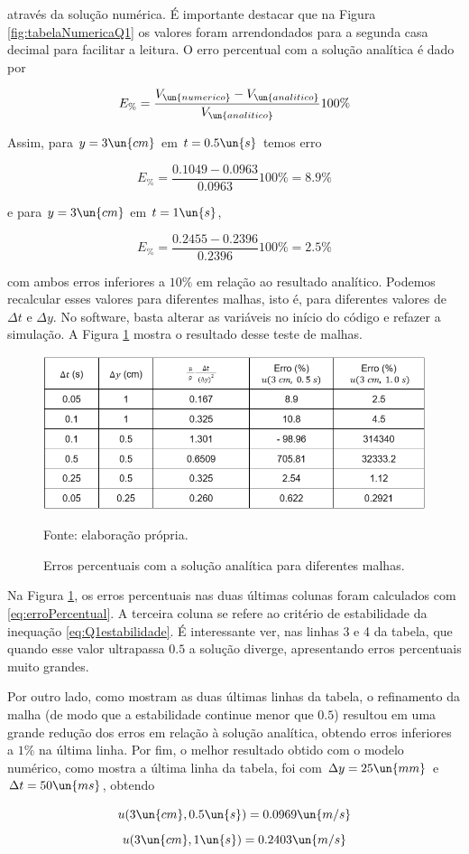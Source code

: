 \noindent através da solução numérica. É importante destacar que na Figura \ref*{fig:tabelaNumericaQ1}
os valores foram arrendondados para a segunda casa decimal para facilitar a leitura.
O erro percentual com a solução analítica é dado por 

\begin{equation}\label{eq:erroPercentual}
    E_{\%} = \frac{V_{\un{numerico}} - V_{\un{analitico}}}{V_{\un{analitico}}} 100\%
\end{equation}

Assim, para $y = 3 \un{cm}$ em $t = 0.5 \un{s}$ temos erro  

\[ E_{\%} = \frac{0.1049 - 0.0963}{0.0963} 100\% = 8.9\% \]

\noindent e para $y = 3 \un{cm}$ em $t = 1 \un{s}$,

\[ E_{\%} = \frac{0.2455 - 0.2396}{0.2396} 100\% = 2.5\% \]

\noindent com ambos erros inferiores a $10\%$ em relação ao resultado analítico. Podemos recalcular
esses valores para diferentes malhas, isto é, para diferentes valores de $\Delta t$ e
$\Delta y$. No software, basta alterar as variáveis no início do código e refazer
a simulação. A Figura \ref*{fig:testeDeMalhas} mostra o resultado desse teste de malhas.

\begin{figure}[h!]
    \caption{Erros percentuais com a solução analítica para diferentes malhas.}
    \label{fig:testeDeMalhas}
    \centering
    \centerline{\includegraphics[scale=0.50]{testeDeMalhas.png}}
    \par{Fonte: elaboração própria.}
\end{figure}

Na Figura \ref*{fig:testeDeMalhas}, os erros percentuais nas duas últimas colunas
foram calculados com \eqref{eq:erroPercentual}. A terceira coluna se refere ao critério de estabilidade 
da inequação \eqref{eq:Q1estabilidade}. É interessante ver, nas linhas 3 e 4 da tabela, 
que quando esse valor ultrapassa $0.5$ a solução diverge, apresentando erros 
percentuais muito grandes. 

Por outro lado, como mostram as duas últimas linhas da tabela, o 
refinamento da malha (de modo que a estabilidade continue menor que $0.5$) resultou em uma grande
redução dos erros em relação à solução analítica, obtendo erros inferiores a $1\%$ na última linha.
Por fim, o melhor resultado obtido com o modelo numérico, como mostra a última linha da tabela,
foi com $\Delta y = 25 \un{mm}$ e $\Delta t = 50 \un{ms}$, obtendo 

\[ u(3 \un{cm}, 0.5 \un{s}) = 0.0969 \un{m/s} \]
\[ u(3 \un{cm}, 1 \un{s}) = 0.2403 \un{m/s} \]




